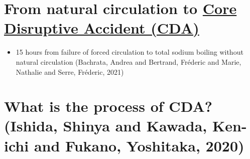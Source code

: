 \documentclass[11pt]{article}
\begin{document}
\section{From natural circulation to \href{20240307154931-core_disruptive_accident_cda.org}{Core Disruptive Accident (CDA)}}
\label{sec:orgd855605}
\begin{itemize}
\item 15 hours from failure of forced circulation to total sodium boiling without natural circulation (Bachrata, Andrea and Bertrand, Fr{\'e}deric and Marie, Nathalie and Serre, Fr{\'e}deric, 2021)
\end{itemize}

\section{What is the process of CDA? (Ishida, Shinya and Kawada, Ken-ichi and Fukano, Yoshitaka, 2020)}
\label{sec:org1d0c949}
\end{document}
